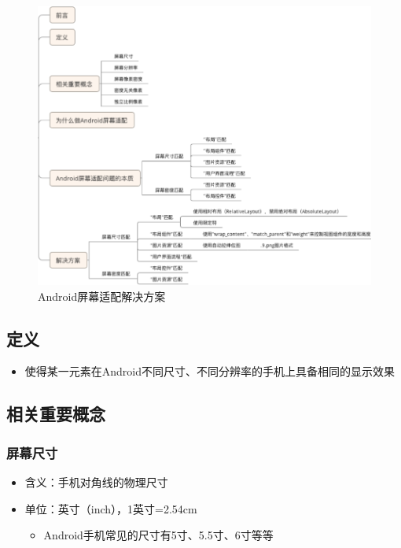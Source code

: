 \documentclass[9pt, b5paper]{article}
\begin{document}
\begin{figure}[htb]
\centering
\includegraphics[width=.9\linewidth]{./pic/screenAdapter.png}
\caption{Android屏幕适配解决方案}
\end{figure}

\subsection{定义}
\label{sec-1-3}
\begin{itemize}
\item 使得某一元素在Android不同尺寸、不同分辨率的手机上具备相同的显示效果
\end{itemize}
\subsection{相关重要概念}
\label{sec-1-4}
\subsubsection{屏幕尺寸}
\label{sec-1-4-1}
\begin{itemize}
\item 含义：手机对角线的物理尺寸
\item 单位：英寸（inch），1英寸=2.54cm
\begin{itemize}
\item Android手机常见的尺寸有5寸、5.5寸、6寸等等
\end{itemize}
\end{itemize}
\end{document}
